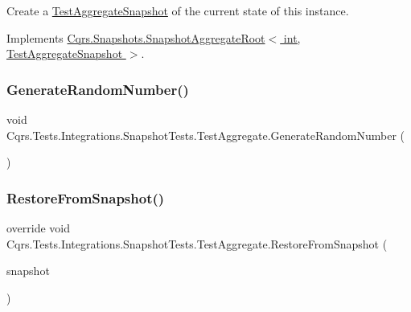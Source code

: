 Create a \hyperlink{classCqrs_1_1Tests_1_1Integrations_1_1SnapshotTests_1_1TestAggregateSnapshot}{Test\+Aggregate\+Snapshot} of the current state of this instance. 



Implements \hyperlink{classCqrs_1_1Snapshots_1_1SnapshotAggregateRoot_a2d8cd57c7b6c2696d286c6dc5e9f0479_a2d8cd57c7b6c2696d286c6dc5e9f0479}{Cqrs.\+Snapshots.\+Snapshot\+Aggregate\+Root$<$ int, Test\+Aggregate\+Snapshot $>$}.

\mbox{\label{classCqrs_1_1Tests_1_1Integrations_1_1SnapshotTests_1_1TestAggregate_a8b34f0ab097cb730ab601feded496682_a8b34f0ab097cb730ab601feded496682}} 
\subsubsection{\texorpdfstring{Generate\+Random\+Number()}{GenerateRandomNumber()}}
{\footnotesize\ttfamily void Cqrs.\+Tests.\+Integrations.\+Snapshot\+Tests.\+Test\+Aggregate.\+Generate\+Random\+Number (\begin{DoxyParamCaption}{ }\end{DoxyParamCaption})}

\mbox{\label{classCqrs_1_1Tests_1_1Integrations_1_1SnapshotTests_1_1TestAggregate_ae4109412037b8ec13755d2fa48fa99ab_ae4109412037b8ec13755d2fa48fa99ab}} 
\subsubsection{\texorpdfstring{Restore\+From\+Snapshot()}{RestoreFromSnapshot()}}
{\footnotesize\ttfamily override void Cqrs.\+Tests.\+Integrations.\+Snapshot\+Tests.\+Test\+Aggregate.\+Restore\+From\+Snapshot (\begin{DoxyParamCaption}\item[{\hyperlink{classCqrs_1_1Tests_1_1Integrations_1_1SnapshotTests_1_1TestAggregateSnapshot}{Test\+Aggregate\+Snapshot}}]{snapshot }\end{DoxyParamCaption})\hspace{0.3cm}{\ttfamily [protected]}}



